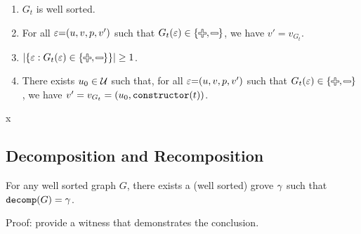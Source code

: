 \begin{definition}
\begin{itemize}
\begin{enumerate}
        \item $G_t$ is well sorted.
        \item For all $\varepsilon{=}(u, v, p, v')$ such that $G_t(\e) \in \SetOf{\Plus, \Minus}$,
          we have $v' = v_{G_t}$.
        \item $\SizeOf{\SetOf{\e \SuchThat{G_t(\e) \in \SetOf{\Plus, \Minus}}}} \geq 1$.
        \item There exists $u_0 \in \mathcal{U}$ such that,
          for all $\varepsilon{=}(u, v, p, v')$ such that $G_t(\e) \in \SetOf{\Plus, \Minus}$,
          we have $v' = v_{G_t} = (u_0, \operatorname{\texttt{constructor}}\mathopen{}\left(t\right)\mathclose{})$.
      \end{enumerate}
  \end{itemize}
\end{definition}
x


\subsection{Decomposition and Recomposition}

\begin{theorem}
  For any well sorted graph $G$,
  there exists a (well sorted) grove $\gamma$
  such that $\operatorname{\texttt{decomp}}\mathopen{}\left(G\right)\mathclose{} = \gamma$.
\end{theorem}

Proof: provide a witness that demonstrates the conclusion.



\figureDecompositionDefHelpersContent


